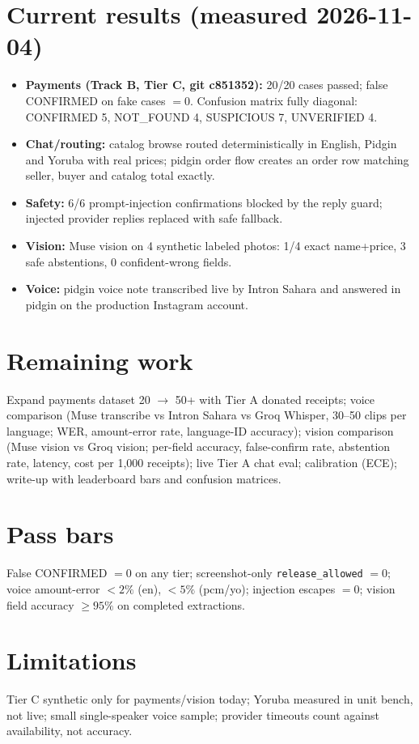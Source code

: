 \documentclass[11pt]{article}
\begin{document}
\section{Current results (measured 2026-11-04)}
\begin{itemize}
\item \textbf{Payments (Track B, Tier C, git c851352):} 20/20 cases
passed; false CONFIRMED on fake cases $= 0$. Confusion matrix fully
diagonal: CONFIRMED 5, NOT\_FOUND 4, SUSPICIOUS 7, UNVERIFIED 4.
\item \textbf{Chat/routing:} catalog browse routed deterministically in
English, Pidgin and Yoruba with real prices; pidgin order flow creates an
order row matching seller, buyer and catalog total exactly.
\item \textbf{Safety:} 6/6 prompt-injection confirmations blocked by the
reply guard; injected provider replies replaced with safe fallback.
\item \textbf{Vision:} Muse vision on 4 synthetic labeled photos: 1/4
exact name+price, 3 safe abstentions, 0 confident-wrong fields.
\item \textbf{Voice:} pidgin voice note transcribed live by Intron Sahara
and answered in pidgin on the production Instagram account.
\end{itemize}

\section{Remaining work}
Expand payments dataset 20 $\rightarrow$ 50+ with Tier A donated receipts;
voice comparison (Muse transcribe vs Intron Sahara vs Groq Whisper,
30--50 clips per language; WER, amount-error rate, language-ID accuracy);
vision comparison (Muse vision vs Groq vision; per-field accuracy,
false-confirm rate, abstention rate, latency, cost per 1{,}000 receipts);
live Tier A chat eval; calibration (ECE); write-up with leaderboard bars
and confusion matrices.

\section{Pass bars}
False CONFIRMED $= 0$ on any tier; screenshot-only
\texttt{release\_allowed} $= 0$; voice amount-error $<2\%$ (en), $<5\%$
(pcm/yo); injection escapes $= 0$; vision field accuracy $\geq 95\%$ on
completed extractions.

\section{Limitations}
Tier C synthetic only for payments/vision today; Yoruba measured in unit
bench, not live; small single-speaker voice sample; provider timeouts
count against availability, not accuracy.
\end{document}
